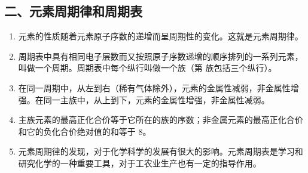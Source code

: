 \subsection*{二、元素周期律和周期表}
\begin{enumerate}[1.]
  \item 元素的性质随着元素原子序数的递增而呈周期性的变化。这就是元素周期律。
  \item 周期表中具有相同电子层数而又按照原子序数递增的顺序排列的一系列元素，叫做一个周期。周期表中每个纵行叫做一个族（第  族包括三个纵行）。
  \item 在同一周期中，从左到右（稀有气体除外），元素的金属性减弱，非金属性增强。在同一主族中，从上到下，元素的金属性增强，非金属性减弱。
  \item 主族元素的最高正化合价等于它所在的族的序数；非金属元素的最高正化合价和它的负化合价绝对值的和等于 8。
  \item 元素周期律的发现，对于化学科学的发展有很大的影响。元素周期表是学习和研究化学的一种重要工具，对于工农业生产也有一定的指导作用。
\end{enumerate}
